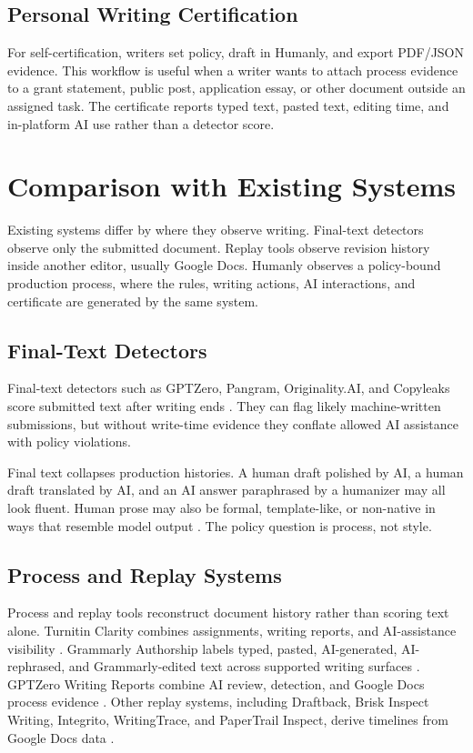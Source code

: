 \documentclass[11pt]{article}
\begin{document}
\subsection{Personal Writing Certification}

For self-certification, writers set policy, draft in Humanly, and export PDF/JSON evidence. This workflow is useful when a writer wants to attach process evidence to a grant statement, public post, application essay, or other document outside an assigned task. The certificate reports typed text, pasted text, editing time, and in-platform AI use rather than a detector score.

\section{Comparison with Existing Systems}
\label{sec:comparison}

Existing systems differ by where they observe writing. Final-text detectors observe only the submitted document. Replay tools observe revision history inside another editor, usually Google Docs. Humanly observes a policy-bound production process, where the rules, writing actions, AI interactions, and certificate are generated by the same system.

\subsection{Final-Text Detectors}

Final-text detectors such as GPTZero, Pangram, Originality.AI, and Copyleaks score submitted text after writing ends \citep{gptzero2026detector,pangram2026detector,originality2026detector,copyleaks2026detector}. They can flag likely machine-written submissions, but without write-time evidence they conflate allowed AI assistance with policy violations.

Final text collapses production histories. A human draft polished by AI, a human draft translated by AI, and an AI answer paraphrased by a humanizer may all look fluent. Human prose may also be formal, template-like, or non-native in ways that resemble model output \citep{liang2023gpt}. The policy question is process, not style.

\subsection{Process and Replay Systems}

Process and replay tools reconstruct document history rather than scoring text alone. Turnitin Clarity combines assignments, writing reports, and AI-assistance visibility \citep{turnitin2026clarity}. Grammarly Authorship labels typed, pasted, AI-generated, AI-rephrased, and Grammarly-edited text across supported writing surfaces \citep{grammarly2026authorship}. GPTZero Writing Reports combine AI review, detection, and Google Docs process evidence \citep{gptzero2026writingreport,gptzero2026turnitinbrisk}. Other replay systems, including Draftback, Brisk Inspect Writing, Integrito, WritingTrace, and PaperTrail Inspect, derive timelines from Google Docs data \citep{draftback2026replay,brisk2025inspectwriting,integrito2026activityreport,writingtrace2026,papertrail2026inspect}.
\end{document}
